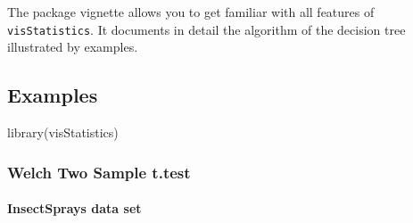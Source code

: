 \documentclass[
]{article}
\newenvironment{Shaded}{\begin{snugshade}}{\end{snugshade}}
\newcommand{\FunctionTok}[1]{\textcolor[rgb]{0.00,0.00,0.00}{#1}}
\newcommand{\NormalTok}[1]{#1}
\begin{document}
The package vignette allows you to get familiar with all features of
\texttt{visStatistics}. It documents in detail the algorithm of the
decision tree illustrated by examples.

\hypertarget{examples}{%
\subsection{Examples}\label{examples}}

\begin{Shaded}
\begin{Highlighting}[]
\FunctionTok{library}\NormalTok{(visStatistics)}
\end{Highlighting}
\end{Shaded}

\hypertarget{welch-two-sample-t.test}{%
\subsubsection{Welch Two Sample t.test}\label{welch-two-sample-t.test}}

\hypertarget{insectsprays-data-set}{%
\paragraph{InsectSprays data set}\label{insectsprays-data-set}}
\end{document}

